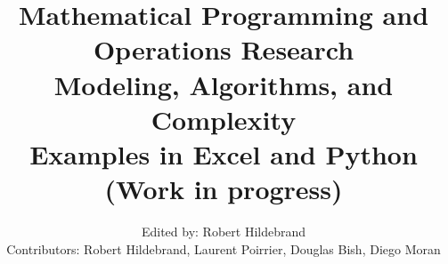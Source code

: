  \title{ \textbf{Mathematical Programming and\\ Operations Research}\\ Modeling, Algorithms, and Complexity\\
 Examples in Excel and Python\\
 (Work in progress)}
  \author{Edited by: Robert Hildebrand\\[1ex]
 Contributors:
 Robert Hildebrand, Laurent Poirrier, Douglas Bish, Diego Moran \\
  }

